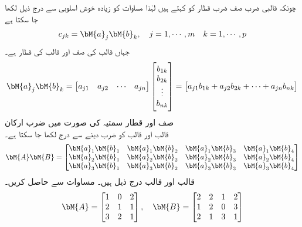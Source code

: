 چونکہ قالبی ضرب صف ضرب قطار کو کہتے ہیں لہٰذا مساوات  کو زیادہ خوش اسلوبی سے درج ذیل لکھا جا سکتا ہے
\begin{align}\label{مساوات_الجبرائی_قالبی_ضرب_ب}
c_{jk}=\bM{a}_j \bM{b}_k,\quad j=1,\cdots,m \quad k=1,\cdots,p
\end{align} 
جہاں  قالب  کی صف  اور  قالب  کی قطار  ہے۔ 
\begin{align*}
\bM{a}_j\bM{b}_k=
\begin{bmatrix}
a_{j1}& a_{j2}& \cdots & a_{jn}
\end{bmatrix}
\begin{bmatrix}
b_{1k}\\
b_{2k}\\
\vdots\\
b_{nk}
\end{bmatrix}=
\begin{bmatrix}
a_{j1}b_{1k}+a_{j2}b_{2k}+\cdots +a_{jn}b_{nk}
\end{bmatrix}
\end{align*}
\quad صف اور قطار سمتیہ کی صورت میں ضرب ارکان\\
 قالب  اور  قالب  کو ضرب دینے سے درج لکھا جا سکتا ہے۔
\begin{align}\label{مساوات_الجبرا_ضرب_تین_چار}
\bM{A} \bM{B}=
\begin{bmatrix}
\bM{a}_1\bM{b}_1 & \bM{a}_1\bM{b}_2 & \bM{a}_1\bM{b}_3 & \bM{a}_1\bM{b}_4 \\
\bM{a}_2\bM{b}_1 & \bM{a}_2\bM{b}_2 & \bM{a}_2\bM{b}_3 & \bM{a}_2\bM{b}_4 \\
\bM{a}_3\bM{b}_1 & \bM{a}_3\bM{b}_2 & \bM{a}_3\bM{b}_3 & \bM{a}_3\bM{b}_4 
\end{bmatrix}
\end{align}
 قالب  اور  قالب  درج ذیل ہیں۔ مساوات   سے  حاصل کریں۔
\begin{align*}
\bM{A}=
\begin{bmatrix}
1&0&2\\
2&1&1\\
3&2&1
\end{bmatrix},\quad
\bM{B}=
\begin{bmatrix}
2&2&1&2\\
1&2&0&3\\
2&1&3&1
\end{bmatrix}
\end{align*}
